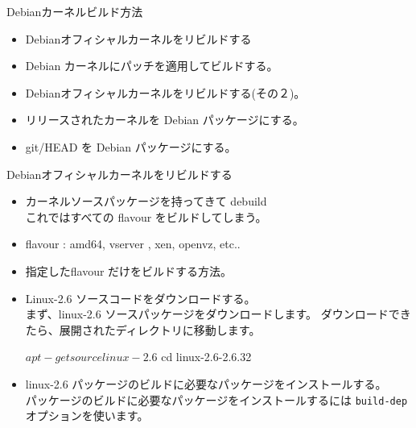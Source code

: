 \begin{frame}[containsverbatim]{Debianカーネルビルド方法}

\begin{itemize}
\item Debianオフィシャルカーネルをリビルドする
\item Debian カーネルにパッチを適用してビルドする。
\item Debianオフィシャルカーネルをリビルドする(その２)。
\item リリースされたカーネルを Debian パッケージにする。
\item git/HEAD を Debian パッケージにする。
\end{itemize}

\end{frame}


\begin{frame}[containsverbatim]{Debianオフィシャルカーネルをリビルドする}

\begin{itemize}
\item カーネルソースパッケージを持ってきて debuild \\
これではすべての flavour をビルドしてしまう。\\
\item flavour : amd64, vserver , xen, openvz,  etc.. 
\item 指定したflavour だけをビルドする方法。
\end{itemize}
\end{frame}

\begin{frame}[containsverbatim]%

\begin{itemize}
\item Linux-2.6 ソースコードをダウンロードする。\\
まず、linux-2.6 ソースパッケージをダウンロードします。
ダウンロードできたら、展開されたディレクトリに移動します。
\begin{commandline}
$ apt-get source linux-2.6
$ cd linux-2.6-2.6.32
\end{commandline}

\item linux-2.6 パッケージのビルドに必要なパッケージをインストールする。\\
パッケージのビルドに必要なパッケージをインストールするには
      \texttt{build-dep}オプションを使います。

\end{itemize}
\end{frame}

